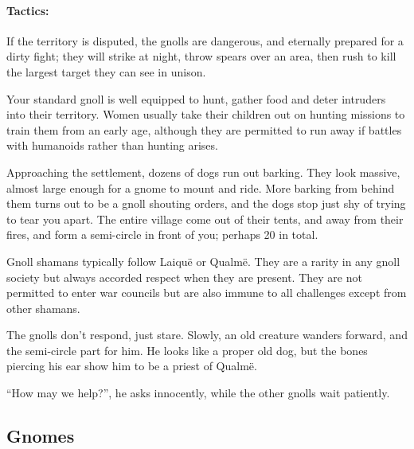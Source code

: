 \begin{multicols}{2}
\paragraph{Tactics:}If the territory is disputed, the gnolls are dangerous, and eternally prepared for a dirty fight; they will strike at night, throw spears over an area, then rush to kill the largest target they can see in unison.

\label{gnoll_hunter}

Your standard gnoll is well equipped to hunt, gather food and deter intruders into their territory.
Women usually take their children out on hunting missions to train them from an early age, although they are permitted to run away if battles with humanoids rather than hunting arises.

\begin{boxtext}

	Approaching the settlement, dozens of dogs run out barking.
	They look massive, almost large enough for a gnome to mount and ride.
	More barking from behind them turns out to be a gnoll shouting orders, and the dogs stop just shy of trying to tear you apart.
	The entire village come out of their tents, and away from their fires, and form a semi-circle in front of you; perhaps 20 in total.

\end{boxtext}

\label{gnoll_shaman}

Gnoll shamans typically follow Laiqu\"{e} or Qualm\"{e}.  They are a rarity in any gnoll society but always accorded respect when they are present.  They are not permitted to enter war councils but are also immune to all challenges except from other shamans.


\begin{boxtext}

	The gnolls don't respond, just stare.	
	Slowly, an old creature wanders forward, and the semi-circle part for him.
	He looks like a proper old dog, but the bones piercing his ear show him to be a priest of Qualm\"{e}.

	``How may we help?'', he asks innocently, while the other gnolls wait patiently.

\end{boxtext}

\subsection{Gnomes}


\end{multicols}
